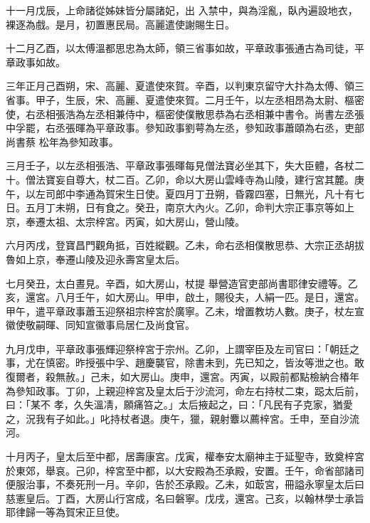 \begin{pinyinscope}
 十一月戊辰，上命諸從姊妹皆分屬諸妃，出
 入禁中，與為淫亂，臥內遍設地衣，裸逐為戲。是月，初置惠民局。高麗遣使謝賜生日。



 十二月乙酉，以太傅溫都思忠為太師，領三省事如故，平章政事張通古為司徒，平章政事如故。



 三年正月己酉朔，宋、高麗、夏遣使來賀。辛酉，以判東京留守大抃為太傅、領三省事。甲子，生辰，宋、高麗、夏遣使來賀。二月壬午，以左丞相昂為太尉、樞密使，右丞相張浩為左丞相兼侍中，樞密使僕散思恭為右丞相兼中書令。尚書左丞張中孚罷，右丞張暉為平章政事。參知政事劉萼為左丞，參知政事蕭頤為右丞，吏部尚書蔡
 松年為參知政事。



 三月壬子，以左丞相張浩、平章政事張暉每見僧法寶必坐其下，失大臣體，各杖二十。僧法寶妄自尊大，杖二百。乙卯，命以大房山雲峰寺為山陵，建行宮其麓。庚午，以左司郎中李通為賀宋生日使。夏四月丁丑朔，昏霧四塞，日無光，凡十有七日。五月丁未朔，日有食之。癸丑，南京大內火。乙卯，命判大宗正事京等如上京，奉遷太祖、太宗梓宮。丙寅，如大房山，營山陵。



 六月丙戌，登寶昌門觀角抵，百姓縱觀。乙未，命右丞相僕散思恭、大宗正丞胡拔魯如上京，奉遷山陵及迎永壽宮皇太后。



 七月癸丑，太白晝見。辛酉，如大房山，杖提
 舉營造官吏部尚書耶律安禮等。乙亥，還宮。八月壬午，如大房山。甲申，啟土，賜役夫，人絹一匹。是日，還宮。甲午，遣平章政事蕭玉迎祭祖宗梓宮於廣寧。乙未，增置教坊人數。庚子，杖左宣徽使敬嗣暉、同知宣徽事烏居仁及尚食官。



 九月戊申，平章政事張輝迎祭梓宮于宗州。乙卯，上謂宰臣及左司官曰：「朝廷之事，尤在慎密。昨授張中孚、趙慶襲官，除書未到，先已知之，皆汝等泄之也。敢復爾者，殺無赦。」己未，如大房山。庚申，還宮。丙寅，以殿前都點檢納合椿年為參知政事。丁卯，上親迎梓宮及皇太后于沙流河，命左右持杖二束，跽太后前，曰：「某不
 孝，久失溫凊，願痛笞之。」太后掖起之，曰：「凡民有子克家，猶愛之，況我有子如此。」叱持杖者退。庚午，獵，親射麞以薦梓宮。壬申，至自沙流河。



 十月丙子，皇太后至中都，居壽康宮。戊寅，權奉安太廟神主于延聖寺，致奠梓宮於東郊，舉哀。己卯，梓宮至中都，以大安殿為丕承殿，安置。壬午，命省部諸司便服治事，不奏死刑一月。辛卯，告於丕承殿。乙未，如菆宮，冊謚永寧皇太后曰慈憲皇后。丁酉，大房山行宮成，名曰磐寧。戊戌，還宮。己亥，以翰林學士承旨耶律歸一等為賀宋正旦使。




\end{pinyinscope}
